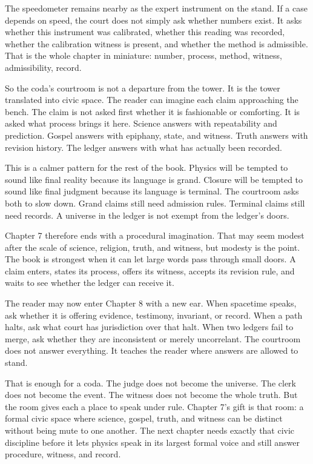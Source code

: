 The speedometer remains nearby as the expert instrument on the stand. If a case
depends on speed, the court does not simply ask whether numbers exist. It asks
whether this instrument was calibrated, whether this reading was recorded,
whether the calibration witness is present, and whether the method is
admissible. That is the whole chapter in miniature: number, process, method,
witness, admissibility, record.

So the coda's courtroom is not a departure from the tower. It is the tower
translated into civic space. The reader can imagine each claim approaching the
bench. The claim is not asked first whether it is fashionable or comforting.
It is asked what process brings it here. Science answers with repeatability and
prediction. Gospel answers with epiphany, state, and witness. Truth answers
with revision history. The ledger answers with what has actually been recorded.

This is a calmer pattern for the rest of the book. Physics will be tempted to
sound like final reality because its language is grand. Closure will be tempted
to sound like final judgment because its language is terminal. The courtroom
asks both to slow down. Grand claims still need admission rules. Terminal
claims still need records. A universe in the ledger is not exempt from the
ledger's doors.

Chapter 7 therefore ends with a procedural imagination. That may seem modest
after the scale of science, religion, truth, and witness, but modesty is the
point. The book is strongest when it can let large words pass through small
doors. A claim enters, states its process, offers its witness, accepts its
revision rule, and waits to see whether the ledger can receive it.

The reader may now enter Chapter 8 with a new ear. When spacetime speaks, ask
whether it is offering evidence, testimony, invariant, or record. When a path
halts, ask what court has jurisdiction over that halt. When two ledgers fail to
merge, ask whether they are inconsistent or merely uncorrelant. The courtroom
does not answer everything. It teaches the reader where answers are allowed to
stand.

That is enough for a coda. The judge does not become the universe. The clerk
does not become the event. The witness does not become the whole truth. But the
room gives each a place to speak under rule. Chapter 7's gift is that room: a
formal civic space where science, gospel, truth, and witness can be distinct
without being mute to one another. The next chapter needs exactly that civic
discipline before it lets physics speak in its largest formal voice and still
answer procedure, witness, and record.
